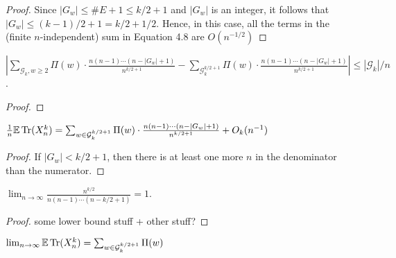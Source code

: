 \begin{proof}
  \notready
  Since $|G_w|\le \#E+1 \le k/2+1$ and $|G_w|$ is an integer, it follows that $|G_w|\le (k-1)/2+1 = k/2 + 1/2$.  Hence, in this case, all the terms in the (finite $n$-independent) sum in Equation 4.8 are $O(n^{-1/2})$
\end{proof}


\begin{proposition}
  \label{prop:g_difference_bound}
  \notready
  $|\sum_{\mathcal{G}_{k}, w \ge 2} \Pi (w) \cdot \frac{n (n-1) \cdots (n - |G_w| + 1)}{n^{k/2+1}}
  - \sum_{\mathcal{G}_k^{k/2+1}}\Pi (w) \cdot \frac{n (n-1) \cdots (n - |G_w| + 1)}{n^{k/2+1}}|
  \le |\mathcal{G}_k|/n$.
\end{proposition}

\begin{proof}
  \notready
\end{proof}


\begin{proposition}%
  \label{prop:trace_ev_special_g}
  \notready
  $\frac1n\mathbb{E}\operatorname{Tr}(X_n^k) = \sum_{w\in\mathcal{G}^{k/2+1}_k} \Pi(w) \cdot \frac{n(n-1)\cdots(n-|G_w|+1)}{n^{k/2+1}} + O_k(n^{-1})$
\end{proposition}

\begin{proof}
  \notready
  If $|G_w| < k/2 + 1$, then there is at least one more $n$ in the denominator than the numerator.
\end{proof}


\begin{proposition}
  \label{lem:fraction_limit_one}
  \notready
  $\lim_{n\to\infty}\frac{n^{k/2}}{n(n-1)\cdots(n-k/2+1)} = 1$.
\end{proposition}

\begin{proof}
  \notready
  some lower bound stuff + other stuff?
\end{proof}


\begin{proposition}
  \label{prop:trace_ev_limit_equals_sum}
  \notready
  $\lim_{n\to\infty}\mathbb{E}\operatorname{Tr}(X_n^k) = \sum_{w\in\mathcal{G}^{k/2+1}_k} \Pi(w)$
\end{proposition}

